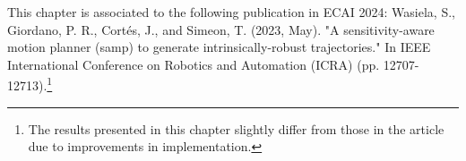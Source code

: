 This chapter is associated to the following publication in ECAI 2024: Wasiela, S., Giordano, P. R., Cortés, J., and Simeon, T. (2023, May). "A sensitivity-aware motion planner (samp) to generate intrinsically-robust trajectories." In IEEE International Conference on Robotics and Automation (ICRA) (pp. 12707-12713).\footnote{The results presented in this chapter slightly differ from those in the article due to improvements in implementation.}







